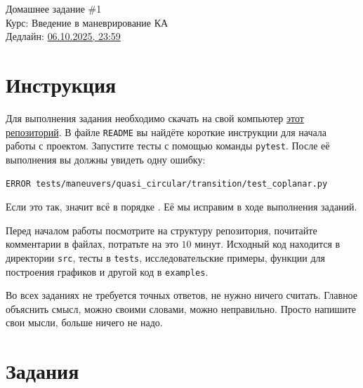 \documentclass[12pt]{article}
\begin{document}
\begin{center}
  {\LARGE Домашнее задание \#1}\\[4pt]
  {\large Курс: Введение в маневрирование КА}\\[2pt]
  {\small Дедлайн: \underline{06.10.2025, 23:59} }
\end{center}

\bigskip

\section*{Инструкция}
Для выполнения задания необходимо скачать на свой компьютер \href{https://github.com/Chelovechek-move/maneuvering}{этот репозиторий}. В файле \texttt{README} вы найдёте короткие инструкции для начала работы с проектом. Запустите тесты с помощью команды \texttt{pytest}. После её выполнения вы должны увидеть одну ошибку: 
\begin{center}
    \texttt{ERROR tests/maneuvers/quasi\_circular/transition/test\_coplanar.py}    
\end{center}
Если это так, значит всё в порядке \smiley. Её мы исправим в ходе выполнения заданий. 

Перед началом работы посмотрите на структуру репозитория, почитайте комментарии в файлах, потратьте на это $10$ минут. Исходный код находится в директории \texttt{src}, тесты в \texttt{tests}, исследовательские примеры, функции для построения графиков и другой код в \texttt{examples}. 

Во всех заданиях не требуется точных ответов, не нужно ничего считать. Главное объяснить смысл, можно своими словами, можно неправильно. Просто напишите свои мысли, больше ничего не надо. 


\section*{Задания}
\end{document}

